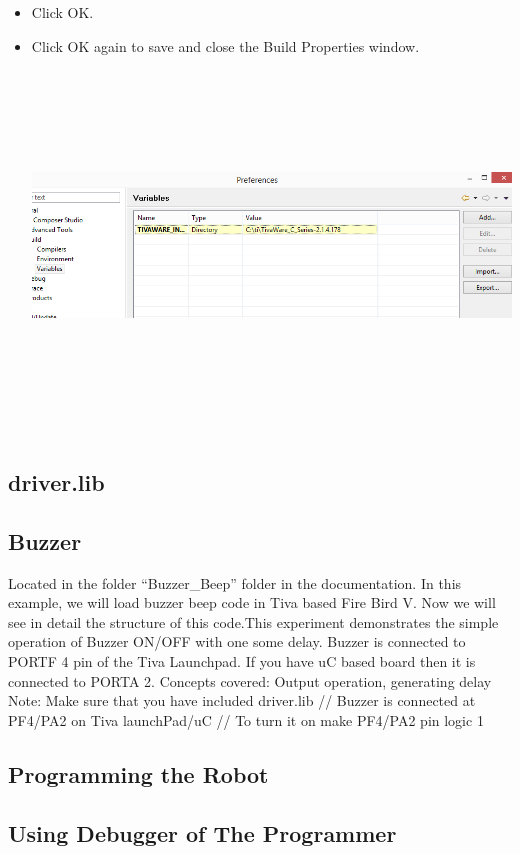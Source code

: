 \documentclass[a4paper,10pt,oneside]{article}
\begin{document}
\begin{itemize}
						\item  Click OK.
						\item  Click OK again to save and close
						the Build Properties window.\\
						\includegraphics[width=20cm,height=10cm]{AddVariables9}
					\end{itemize}
		\subsection{\huge driver.lib}
		\subsection{\huge Buzzer}
		{
			Located in the folder “Buzzer\_Beep” folder in the documentation.
			In this example, we will load buzzer beep code in Tiva based Fire Bird V. Now we will see in
			detail the structure of this code.This experiment demonstrates the simple operation of Buzzer ON/OFF with one some delay.
			Buzzer is connected to PORTF 4 pin of the Tiva Launchpad. If you have uC based board then it is connected to PORTA 2.
			Concepts covered: Output operation, generating delay
			Note: Make sure that you have included  driver.lib
			// Buzzer is connected at PF4/PA2 on Tiva launchPad/uC
			// To turn it on make PF4/PA2 pin logic 1
			
		}
		\subsection{\huge Programming the Robot}
		\subsection{\huge Using Debugger of The Programmer}
\end{document}
